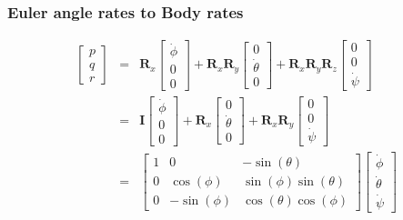 \subsubsection{Euler angle rates to Body rates}
\begin{equation} \nonumber
    \begin{aligned}
        \begin{bmatrix}
            p \\
            q \\
            r
        \end{bmatrix} & = &
        \mathbf{R}_x
        \begin{bmatrix}
            \dot{\phi} \\
            0          \\
            0
        \end{bmatrix} +
        \mathbf{R}_x
        \mathbf{R}_y
        \begin{bmatrix}
            0            \\
            \dot{\theta} \\
            0
        \end{bmatrix} +
        \mathbf{R}_x
        \mathbf{R}_y
        \mathbf{R}_z
        \begin{bmatrix}
            0 \\
            0 \\
            \dot{\psi}
        \end{bmatrix}        \\
                        & = &
        \mathbf{I}
        \begin{bmatrix}
            \dot{\phi} \\
            0          \\
            0
        \end{bmatrix} +
        \mathbf{R}_x
        \begin{bmatrix}
            0            \\
            \dot{\theta} \\
            0
        \end{bmatrix} +
        \mathbf{R}_x
        \mathbf{R}_y
        \begin{bmatrix}
            0 \\
            0 \\
            \dot{\psi}
        \end{bmatrix}        \\
        & = &
        \begin{bmatrix}
            1 & 0           & -\sin(\theta)           \\
            0 & \cos(\phi)  & \sin(\phi) \sin(\theta) \\
            0 & -\sin(\phi) & \cos(\theta)\cos(\phi)
        \end{bmatrix}
        \begin{bmatrix}
            \dot{\phi}   \\
            \dot{\theta} \\
            \dot{\psi}
        \end{bmatrix}
    \end{aligned}
\end{equation}

